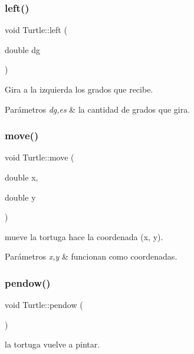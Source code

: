 \subsubsection{\texorpdfstring{left()}{left()}}
{\footnotesize\ttfamily void Turtle\+::left (\begin{DoxyParamCaption}\item[{double}]{dg }\end{DoxyParamCaption})}

Gira a la izquierda los grados que recibe. 
\begin{DoxyParams}{Parámetros}
{\em dg,es} & la cantidad de grados que gira. \\
\hline
\end{DoxyParams}
\mbox{\label{classTurtle_a486b5b199b51322309f969dd2c028fae}} 
\subsubsection{\texorpdfstring{move()}{move()}}
{\footnotesize\ttfamily void Turtle\+::move (\begin{DoxyParamCaption}\item[{double}]{x,  }\item[{double}]{y }\end{DoxyParamCaption})}

mueve la tortuga hace la coordenada (x, y). 
\begin{DoxyParams}{Parámetros}
{\em x,y} & funcionan como coordenadas. \\
\hline
\end{DoxyParams}
\mbox{\label{classTurtle_aabe573f505a789dfe84fc2219ec0cb10}} 
\subsubsection{\texorpdfstring{pendow()}{pendow()}}
{\footnotesize\ttfamily void Turtle\+::pendow (\begin{DoxyParamCaption}{ }\end{DoxyParamCaption})}

la tortuga vuelve a pintar. \mbox{\label{classTurtle_a40367ef16bd84c7d382992b8e6d3a9fc}} 
